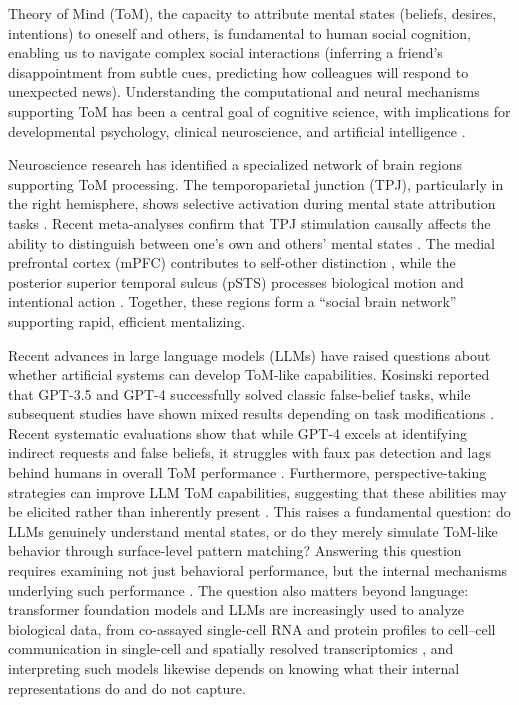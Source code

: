 \documentclass[conference]{IEEEtran}
\begin{document}
Theory of Mind (ToM), the capacity to attribute mental states (beliefs, desires, intentions) to oneself and others, is fundamental to human social cognition, enabling us to navigate complex social interactions (inferring a friend's disappointment from subtle cues, predicting how colleagues will respond to unexpected news). Understanding the computational and neural mechanisms supporting ToM has been a central goal of cognitive science, with implications for developmental psychology, clinical neuroscience, and artificial intelligence \cite{frith2006neural, saxe2013people}.

Neuroscience research has identified a specialized network of brain regions supporting ToM processing. The temporoparietal junction (TPJ), particularly in the right hemisphere, shows selective activation during mental state attribution tasks \cite{saxe2013people, strachan2024testing}. Recent meta-analyses confirm that TPJ stimulation causally affects the ability to distinguish between one's own and others' mental states \cite{soutschek2025causal}. The medial prefrontal cortex (mPFC) contributes to self-other distinction \cite{amodio2006meeting}, while the posterior superior temporal sulcus (pSTS) processes biological motion and intentional action \cite{allison2000social}. Together, these regions form a ``social brain network'' \cite{mar2011neural} supporting rapid, efficient mentalizing.

Recent advances in large language models (LLMs) have raised questions about whether artificial systems can develop ToM-like capabilities. Kosinski \cite{kosinski2024evaluating} reported that GPT-3.5 and GPT-4 successfully solved classic false-belief tasks, while subsequent studies have shown mixed results depending on task modifications \cite{ullman2023large, shapira2024clever}. Recent systematic evaluations show that while GPT-4 excels at identifying indirect requests and false beliefs, it struggles with faux pas detection and lags behind humans in overall ToM performance \cite{strachan2024testing, chen2024tombench}. Furthermore, perspective-taking strategies can improve LLM ToM capabilities, suggesting that these abilities may be elicited rather than inherently present \cite{wilf2024think}. This raises a fundamental question: do LLMs genuinely understand mental states, or do they merely simulate ToM-like behavior through surface-level pattern matching? Answering this question requires examining not just behavioral performance, but the internal mechanisms underlying such performance \cite{sap2022neural, marcus2023large}. The question also matters beyond language: transformer foundation models and LLMs are increasingly used to analyze biological data, from co-assayed single-cell RNA and protein profiles \cite{ji2026captain} to cell--cell communication in single-cell and spatially resolved transcriptomics \cite{ji2024spaccc, ji2024scdca}, and interpreting such models likewise depends on knowing what their internal representations do and do not capture.
\end{document}
